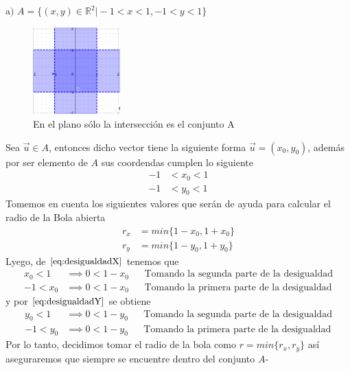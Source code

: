 \documentclass[letterpaper]{article}
\renewcommand{\*}{\cdot}
\theoremstyle{definition}
\begin{document}
$\text{a) } A = \{ (x,y) \in \mathbb{R}^2 \vert - 1 < x < 1, - 1 < y < 1 \}$
\begin{figure}[h!]
	\centering
	\includegraphics[width=0.3\textwidth]{1a}
	\caption{En el plano sólo la intersección es el conjunto A}
\end{figure}
Sea $ \vec{u} \in A $, entonces dicho vector tiene la siguiente forma $\vec{u} = (x_0, y_0)  $, además por ser elemento de $ A $ sus coordendas cumplen lo siguiente
\begin{align*}
	-1 &< x_0 < 1 \label{eq:desigualdadX} \tag{ \saturn } \\
	-1 &< y_0 < 1 \label{eq:desigualdadY} \tag{ \jupiter}
\end{align*}
Tomemos en cuenta los siguientes valores que serán de ayuda para calcular el radio de la Bola abierta
 \begin{align*}
 	r_x &= min\{ 1-x_0, 1+x_0 \} \label{eq:radioX} \tag{ \textdelta}\\
 	r_y &= min\{ 1-y_0, 1+y_0 \} \label{eq:radioY} \tag{\textxi}
 \end{align*}
Lyego, de $ \ref{eq:desigualdadX} $ tenemos que
\begin{align*}
	x_0 < 1 &\implies 0 < 1 - x_0 && \text{Tomando la segunda parte de la desigualdad} \\
	-1 < x_0 &\implies 0 < 1 - x_0 &&\text{Tomando la primera parte de la desigualdad}
\end{align*}
y por $ \ref{eq:desigualdadY} $ se obtiene
\begin{align*}
	y_0 < 1 &\implies 0 < 1 - y_0 && \text{Tomando la segunda parte de la desigualdad} \\
	-1 < y_0 &\implies 0 < 1 - y_0 &&\text{Tomando la primera parte de la desigualdad}
\end{align*}
Por lo tanto, decidimos tomar el radio de la bola como $ r = min\{ r_x, r_y\} $ así aseguraremos que siempre se encuentre dentro del conjunto $ A $-\\
\end{document}
